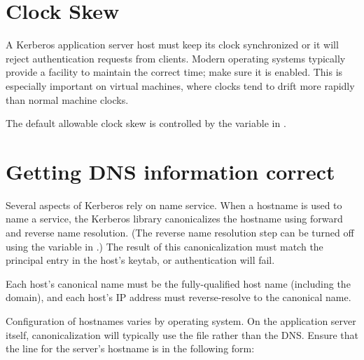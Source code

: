 \documentclass[letterpaper,10pt,english]{sphinxmanual}
\begin{document}
\section{Clock Skew}
\label{\detokenize{admin/appl_servers:clock-skew}}
A Kerberos application server host must keep its clock synchronized or
it will reject authentication requests from clients.  Modern operating
systems typically provide a facility to maintain the correct time;
make sure it is enabled.  This is especially important on virtual
machines, where clocks tend to drift more rapidly than normal machine
clocks.

The default allowable clock skew is controlled by the 
variable in {\hyperref[\detokenize{admin/conf_files/krb5_conf:libdefaults}]{}}.


\section{Getting DNS information correct}
\label{\detokenize{admin/appl_servers:getting-dns-information-correct}}
Several aspects of Kerberos rely on name service.  When a hostname is
used to name a service, the Kerberos library canonicalizes the
hostname using forward and reverse name resolution.  (The reverse name
resolution step can be turned off using the  variable in
{\hyperref[\detokenize{admin/conf_files/krb5_conf:libdefaults}]{}}.)  The result of this canonicalization must match
the principal entry in the host’s keytab, or authentication will fail.

Each host’s canonical name must be the fully-qualified host name
(including the domain), and each host’s IP address must
reverse-resolve to the canonical name.

Configuration of hostnames varies by operating system.  On the
application server itself, canonicalization will typically use the
 file rather than the DNS.  Ensure that the line for the
server’s hostname is in the following form:

%
\begin{sphinxVerbatim}[commandchars=\\\{\}]
                
\end{sphinxVerbatim}
\end{document}
